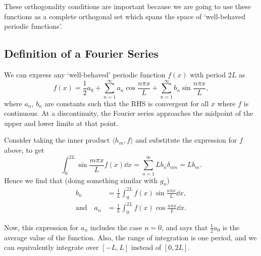 These orthogonality conditions are important because we are going to use these functions as a complete orthogonal set which spans the space of `well-behaved periodic functions'.


\subsection{Definition of a Fourier Series}

We can express any `well-behaved' periodic function $f(x)$ with period $2L$ as
$$
f(x)=\frac{1}{2} a_{0}+\sum_{n=1}^{\infty} a_{n} \cos \frac{n \pi x}{L}+\sum_{n=1}^{\infty} b_{n} \sin \frac{n \pi x}{L},
$$
where $a_n$, $b_n$ are constants such that the RHS is convergent for all $x$ where $f$ is continuous. At a discontinuity, the Fourier series approaches the midpoint of the upper and lower limits at that point.

Consider taking the inner product $\langle h_m, f\rangle$ and substitute the expression for $f$ above, to get
$$
   \int_0^{2L} \sin \frac{m\pi x}{L} f(x) \dd x = \sum_{n = 1}^{\infty} L b_n \delta_{nm} = Lb_m.
$$
Hence we find that (doing something similar with $g_n$)
\begin{align*}
   b_n &= \frac{1}{L}\int_0^{2L} f(x) \sin \frac{n \pi x}{L} \dd x, \\
    \text{and} \quad a_n &= \frac{1}{L}\int_0^{2L} f(x) \cos \frac{n \pi x}{L} \dd x.
\end{align*}

Now, this expression for $a_n$ includes the case $n = 0$, and says that $\frac{1}{2}a_0$ is the average value of the function. Also, the range of integration is one period, and we can equivalently integrate over $[-L, L]$ instead of $[0, 2L]$.

